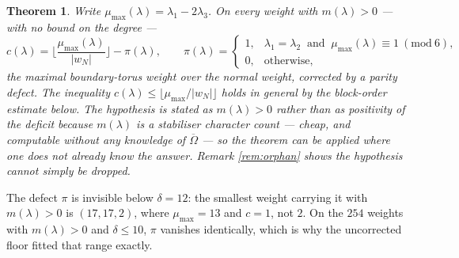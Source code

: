\documentclass[11pt,reqno]{amsart}
\theoremstyle{plain}
\newtheorem{theorem}{Theorem}[section]
\theoremstyle{definition}
\newcommand{\cO}{\overline{\Omega}}
\begin{document}
\begin{theorem}\label{thm:B}
Write $\mu_{\max}(\lambda)=\lambda_1-2\lambda_3$.  On every weight with
$m(\lambda)>0$ --- with no bound on the degree ---
\[
  c(\lambda)=\Big\lfloor\frac{\mu_{\max}(\lambda)}{|w_N|}\Big\rfloor-\pi(\lambda),
  \qquad
  \pi(\lambda)=
  \begin{cases}
    1,&\lambda_1=\lambda_2\ \text{ and }\ \mu_{\max}(\lambda)\equiv1\ (\mathrm{mod}\ 6),\\
    0,&\text{otherwise,}
  \end{cases}
\]
the maximal boundary-torus weight over the normal weight, corrected by a parity
defect.  The inequality
$c(\lambda)\le\lfloor\mu_{\max}/|w_N|\rfloor$ holds in general by the
block-order estimate below.  The hypothesis is stated as
$m(\lambda)>0$ rather than as positivity of the deficit because $m(\lambda)$ is
a stabiliser character count --- cheap, and computable without any knowledge of
$\cO$ --- so the theorem can be applied where one does not already know the
answer.  Remark \ref{rem:orphan} shows the hypothesis cannot simply be dropped.
\end{theorem}

The defect $\pi$ is invisible below $\delta=12$: the smallest weight carrying it
with $m(\lambda)>0$ is $(17,17,2)$, where $\mu_{\max}=13$ and $c=1$, not $2$.
On the $254$ weights with $m(\lambda)>0$ and $\delta\le10$, $\pi$ vanishes
identically, which is why the uncorrected floor fitted that range exactly.
\end{document}
